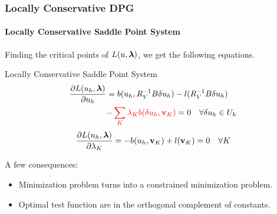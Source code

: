 \documentclass[18pt,xcolor=table]{beamer}
\begin{document}
\begin{frame}
\frametitle{Locally Conservative DPG}
\framesubtitle{Locally Conservative Saddle Point System}
Finding the critical points of $L(u,\boldsymbol\lambda)$, we get the following
equations.
\begin{block}{Locally Conservative Saddle Point System}
\begin{align*}
\frac{\partial L(u_h,\boldsymbol\lambda)}{\partial u_h}&=b(u_h,R_V^{-1}B\delta u_h)
-l(R_V^{-1}B\delta u_h)\\
&{\color{red}-\sum_K\lambda_K b(\delta
u_h,\mathbf{v}_K)}=0\quad\forall\delta u_h\in U_h
\end{align*}
\[
\frac{\partial
L(u_h,\boldsymbol\lambda)}{\partial\lambda_K}=-b(u_h,\mathbf{v}_K)+l(\mathbf{v}_K)=0\quad\forall
K
\]
\end{block}
A few consequences:
\begin{itemize}
\item Minimization problem turns into a constrained minimization problem.
\item Optimal test function are in the orthogonal complement of constants. %
\end{itemize}
\end{frame}
\end{document}
